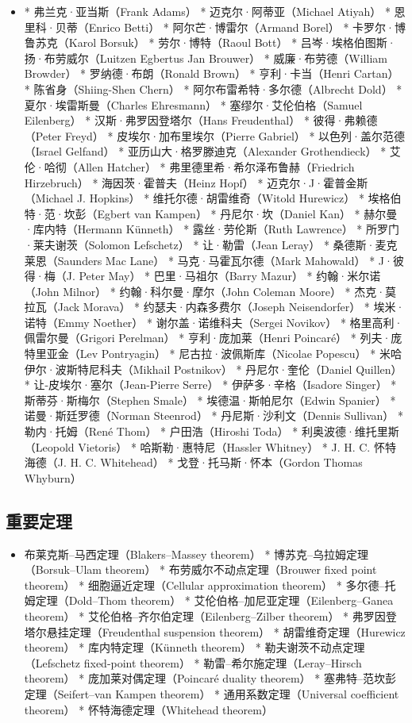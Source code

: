\begin{itemize}
\item * 弗兰克·亚当斯（Frank Adams）
* 迈克尔·阿蒂亚（Michael Atiyah）
* 恩里科·贝蒂（Enrico Betti）
* 阿尔芒·博雷尔（Armand Borel）
* 卡罗尔·博鲁苏克（Karol Borsuk）
* 劳尔·博特（Raoul Bott）
* 吕岑·埃格伯图斯·扬·布劳威尔（Luitzen Egbertus Jan Brouwer）
* 威廉·布劳德（William Browder）
* 罗纳德·布朗（Ronald Brown）
* 亨利·卡当（Henri Cartan）
* 陈省身（Shiing-Shen Chern）
* 阿尔布雷希特·多尔德（Albrecht Dold）
* 夏尔·埃雷斯曼（Charles Ehresmann）
* 塞缪尔·艾伦伯格（Samuel Eilenberg）
* 汉斯·弗罗因登塔尔（Hans Freudenthal）
* 彼得·弗赖德（Peter Freyd）
* 皮埃尔·加布里埃尔（Pierre Gabriel）
* 以色列·盖尔范德（Israel Gelfand）
* 亚历山大·格罗滕迪克（Alexander Grothendieck）
* 艾伦·哈彻（Allen Hatcher）
* 弗里德里希·希尔泽布鲁赫（Friedrich Hirzebruch）
* 海因茨·霍普夫（Heinz Hopf）
* 迈克尔·J·霍普金斯（Michael J. Hopkins）
* 维托尔德·胡雷维奇（Witold Hurewicz）
* 埃格伯特·范·坎彭（Egbert van Kampen）
* 丹尼尔·坎（Daniel Kan）
* 赫尔曼·库内特（Hermann Künneth）
* 露丝·劳伦斯（Ruth Lawrence）
* 所罗门·莱夫谢茨（Solomon Lefschetz）
* 让·勒雷（Jean Leray）
* 桑德斯·麦克莱恩（Saunders Mac Lane）
* 马克·马霍瓦尔德（Mark Mahowald）
* J·彼得·梅（J. Peter May）
* 巴里·马祖尔（Barry Mazur）
* 约翰·米尔诺（John Milnor）
* 约翰·科尔曼·摩尔（John Coleman Moore）
* 杰克·莫拉瓦（Jack Morava）
* 约瑟夫·内森多费尔（Joseph Neisendorfer）
* 埃米·诺特（Emmy Noether）
* 谢尔盖·诺维科夫（Sergei Novikov）
* 格里高利·佩雷尔曼（Grigori Perelman）
* 亨利·庞加莱（Henri Poincaré）
* 列夫·庞特里亚金（Lev Pontryagin）
* 尼古拉·波佩斯库（Nicolae Popescu）
* 米哈伊尔·波斯特尼科夫（Mikhail Postnikov）
* 丹尼尔·奎伦（Daniel Quillen）
* 让-皮埃尔·塞尔（Jean-Pierre Serre）
* 伊萨多·辛格（Isadore Singer）
* 斯蒂芬·斯梅尔（Stephen Smale）
* 埃德温·斯帕尼尔（Edwin Spanier）
* 诺曼·斯廷罗德（Norman Steenrod）
* 丹尼斯·沙利文（Dennis Sullivan）
* 勒内·托姆（René Thom）
* 户田浩（Hiroshi Toda）
* 利奥波德·维托里斯（Leopold Vietoris）
* 哈斯勒·惠特尼（Hassler Whitney）
* J. H. C. 怀特海德（J. H. C. Whitehead）
* 戈登·托马斯·怀本（Gordon Thomas Whyburn）
\end{itemize}
\subsection{重要定理}

\begin{itemize}
\item 布莱克斯–马西定理（Blakers–Massey theorem）
* 博苏克–乌拉姆定理（Borsuk–Ulam theorem）
* 布劳威尔不动点定理（Brouwer fixed point theorem）
* 细胞逼近定理（Cellular approximation theorem）
* 多尔德–托姆定理（Dold–Thom theorem）
* 艾伦伯格–加尼亚定理（Eilenberg–Ganea theorem）
* 艾伦伯格–齐尔伯定理（Eilenberg–Zilber theorem）
* 弗罗因登塔尔悬挂定理（Freudenthal suspension theorem）
* 胡雷维奇定理（Hurewicz theorem）
* 库内特定理（Künneth theorem）
* 勒夫谢茨不动点定理（Lefschetz fixed-point theorem）
* 勒雷–希尔施定理（Leray–Hirsch theorem）
* 庞加莱对偶定理（Poincaré duality theorem）
* 塞弗特–范坎彭定理（Seifert–van Kampen theorem）
* 通用系数定理（Universal coefficient theorem）
* 怀特海德定理（Whitehead theorem）
\end{itemize}

